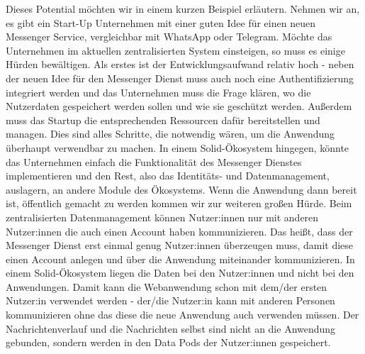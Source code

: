 \documentclass[acmtog]{acmart}
\begin{document}
Dieses Potential möchten wir in einem kurzen Beispiel erläutern. Nehmen wir an, es gibt ein Start-Up Unternehmen mit einer guten Idee für einen neuen Messenger Service, vergleichbar mit WhatsApp oder Telegram. Möchte das Unternehmen im aktuellen zentralisierten System einsteigen, so muss es einige Hürden bewältigen. 
Als erstes ist der Entwicklungsaufwand relativ hoch - neben der neuen Idee für den Messenger Dienst muss auch noch eine Authentifizierung integriert werden und das Unternehmen muss die Frage klären, wo die Nutzerdaten gespeichert werden sollen und wie sie geschützt werden. Außerdem muss das Startup die entsprechenden Ressourcen dafür bereitstellen und managen. Dies sind alles Schritte, die notwendig wären, um die Anwendung überhaupt verwendbar zu machen. In einem Solid-Ökosystem hingegen, könnte das Unternehmen einfach die Funktionalität des Messenger Dienstes implementieren und den Rest, also das Identitäts- und Datenmanagement, auslagern, an andere Module des Ökosystems. 
Wenn die Anwendung dann bereit ist, öffentlich gemacht zu werden kommen wir zur weiteren großen Hürde. Beim zentralisierten Datenmanagement können Nutzer:innen nur mit anderen Nutzer:innen die auch einen Account haben kommunizieren. Das heißt, dass der Messenger Dienst erst einmal genug Nutzer:innen überzeugen muss, damit diese einen Account anlegen und über die Anwendung miteinander kommunizieren. In einem Solid-Ökosystem liegen die Daten bei den Nutzer:innen und nicht bei den Anwendungen. Damit kann die Webanwendung schon mit dem/der ersten Nutzer:in verwendet werden - der/die Nutzer:in kann mit anderen Personen kommunizieren ohne das diese die neue Anwendung auch verwenden müssen. Der Nachrichtenverlauf und die Nachrichten selbst sind nicht an die Anwendung gebunden, sondern werden in den Data Pods der Nutzer:innen gespeichert.




\end{document}
